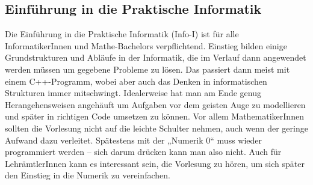 \subsection{Einführung in die Praktische Informatik}
\label{info1}
Die Einführung in die Praktische Informatik (Info-I) ist für alle InformatikerInnen und Mathe-Bachelors verpflichtend. Einstieg bilden einige Grundstrukturen und Abläufe in der Informatik, die im Verlauf dann angewendet werden müssen um gegebene Probleme zu lösen. Das passiert dann meist mit einem C++-Programm, wobei aber auch das Denken in informatischen Strukturen immer mitschwingt. Idealerweise hat man am Ende genug Herangehensweisen angehäuft um Aufgaben vor dem geisten Auge zu modellieren und später in richtigen Code umsetzen zu können. Vor allem MathematikerInnen sollten die Vorlesung nicht auf die leichte Schulter nehmen, auch wenn der geringe Aufwand dazu verleitet. Spätestens mit der „Numerik 0“ muss wieder programmiert werden -- sich darum drücken kann man also nicht. Auch für LehrämtlerInnen kann es interessant sein, die Vorlesung zu hören, um sich später den Einstieg in die Numerik zu vereinfachen.
